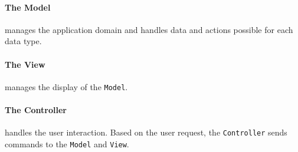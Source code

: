 \paragraph{The Model} manages the application domain and handles data and actions possible for each data type.

\paragraph{The View} manages the display of the \texttt{Model}.

\paragraph{The Controller} handles the user interaction. Based on the user request, the \texttt{Controller} sends commands to the \texttt{Model} and \texttt{View}.